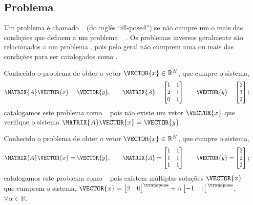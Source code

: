 \subsection{Problema \illposed}
\begin{definition}
\label{def:mal-posto:1}
Um problema é chamado \illposed~ (do inglês ``ill-posed'') se não cumpre um o mais das condições que definem a um problema 
\wellposed~ \cite[pp. 18]{gockenbach2016linear}.
Os problemas inversos geralmente são relacionados a um problema \illposed,
pois pelo geral não cumprem uma ou mais das condições para ser catalogados como \wellposed. 
\end{definition}

\begin{example}
\label{ex:IllPosedNoSolutions}
Conhecido o problema de obter o vetor $\VECTOR{x}\in \mathbb{R}^N$,
que cumpre o sistema,
\begin{equation}
\MATRIX{A}\VECTOR{x}=\VECTOR{y},
\qquad
\MATRIX{A}=
\begin{bmatrix}
1 & 1\\
2 & 1\\
0 & 1
\end{bmatrix}
\qquad
\VECTOR{y}=
\begin{bmatrix}
2\\
3\\
2
\end{bmatrix};
\end{equation}
catalogamos este problema como \illposed~ pois não existe um vetor $\VECTOR{x}$
que verifique o sistema $\MATRIX{A}\VECTOR{x}=\VECTOR{y}$.
\end{example}


\begin{example}
\label{ex:IllPosedMultiplaSolutions}
Conhecido o problema de obter o vetor $\VECTOR{x}\in \mathbb{R}^N$,
que cumpre o sistema,
\begin{equation}
\MATRIX{A}\VECTOR{x}=\VECTOR{y},
\qquad
\MATRIX{A}=
\begin{bmatrix}
1 & 1\\
1 & 1\\
1 & 1
\end{bmatrix}
\qquad
\VECTOR{y}=
\begin{bmatrix}
2\\
2\\
2
\end{bmatrix};
\end{equation}
catalogamos este problema como \illposed~  pois existem múltiplas soluções $\VECTOR{x}$
que cumprem o sistema,
$
\VECTOR{x}=
\begin{bmatrix}
2 & 0
\end{bmatrix}^{\transpose}
+\alpha
\begin{bmatrix}
-1 & 1
\end{bmatrix} ^{\transpose}$,
$ \forall \alpha \in \mathbb{R}$.
\end{example}

